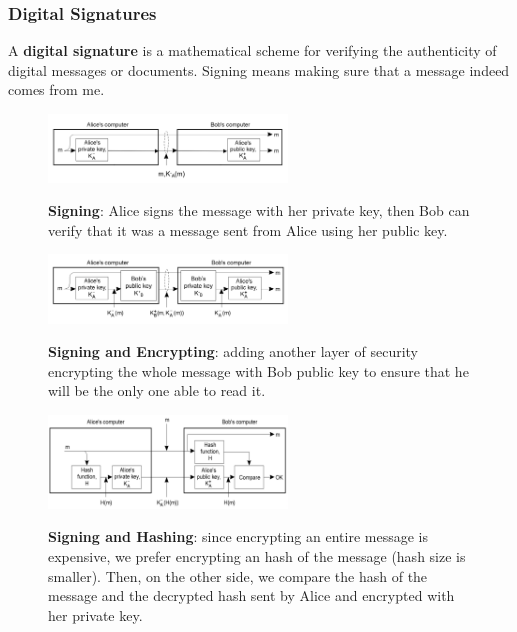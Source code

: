 \documentclass[10pt,a4paper]{article}
\begin{document}
\subsubsection{Digital Signatures}
A \textbf{digital signature} is a mathematical scheme for verifying the authenticity of digital messages or documents. Signing means making sure that a message indeed comes from me. 
\begin{figure}[h!]\hfill \includegraphics[width=180pt]{images/signing.png}\hspace*{\fill}
  \label{fig:signing}
  \caption{\textbf{Signing}: Alice signs the message with her private key, then Bob can verify that it was a message sent from Alice using her public key.}
\end{figure}
\begin{figure}[h!]\hfill \includegraphics[width=180pt]{images/signing-encrypting.png}\hspace*{\fill}
  \label{fig:signing-encrypting}
  \caption{\textbf{Signing and Encrypting}: adding another layer of security encrypting the whole message with Bob public key to ensure that he will be the only one able to read it.}
\end{figure}
\begin{figure}[h!]\hfill \includegraphics[width=180pt]{images/signing-hashing.png}\hspace*{\fill}
  \label{fig:signing-hashing}
  \caption{\textbf{Signing and Hashing}: since encrypting an entire message is expensive, we prefer encrypting an hash of the message (hash size is smaller). Then, on the other side, we compare the hash of the message and the decrypted hash sent by Alice and encrypted with her private key.}
\end{figure}
\end{document}
